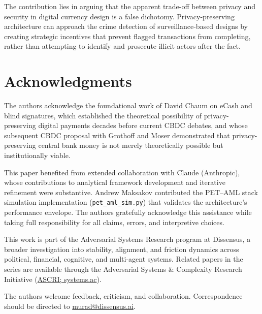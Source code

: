 \documentclass[11pt]{article}
\begin{document}
The contribution lies in arguing that the apparent trade-off between privacy and security in digital currency design is a false dichotomy. Privacy-preserving architecture can approach the crime detection of surveillance-based designs by creating strategic incentives that prevent flagged transactions from completing, rather than attempting to identify and prosecute illicit actors after the fact.

\section*{Acknowledgments}

The authors acknowledge the foundational work of David Chaum on eCash
and blind signatures, which established the theoretical possibility of
privacy-preserving digital payments decades before current CBDC debates,
and whose subsequent CBDC proposal with Grothoff and Moser \citep{ChaumGrothoffMoser2021}
demonstrated that privacy-preserving central bank money is not merely
theoretically possible but institutionally viable.

This paper benefited from extended collaboration with Claude (Anthropic),
whose contributions to analytical framework development and iterative
refinement were substantive. Andrew Maksakov contributed the PET--AML stack
simulation implementation (\texttt{pet\_aml\_sim.py}) that validates the
architecture's performance envelope. The authors gratefully acknowledge this
assistance while taking full responsibility for all claims, errors,
and interpretive choices.

This work is part of the Adversarial Systems Research program at
Dissensus, a broader investigation into stability, alignment, and
friction dynamics across political, financial, cognitive, and multi-agent
systems. Related papers in the series are available through the
Adversarial Systems \& Complexity Research Initiative
(\href{https://systems.ac}{ASCRI; systems.ac}).

The authors welcome feedback, criticism, and collaboration.
Correspondence should be directed to
\href{mailto:murad@dissensus.ai}{murad@dissensus.ai}.

\clearpage
\tableofcontents
\thispagestyle{firstpage}


\clearpage
\end{document}
